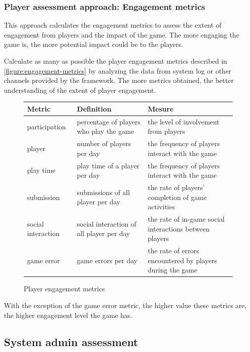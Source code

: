 \documentclass[11pt,oneside]{book}
\newcommand\tabhead[1]{\small\textbf{#1}}
\begin{document}
\subsubsection{Player assessment approach: Engagement metrics}
\label{Engagement metrics}

This approach calculates the engagement metrics to assess the extent of engagement from players and 
the impact of the game. The more engaging the game is, the more potential impact could be to the players.

Calculate as many as possible the player engagement metrics described in \autoref{figure:engagement-metrics} 
by analyzing the data from system log or other channels provided by the framework. The more metrics 
obtained, the better understanding of the extent of player engagement. 

\begin{figure}[ht!]
  \centering
    \begin{tabular}{|p{}|p{}|p{}|}
    \hline
    \tabhead{Metric} &
    \tabhead{Definition} &
    \tabhead{Mesure} \\
    \hline
    participation &
    percentage of players who play the game &
    the level of involvement from players \\
    \hline
    player &
    number of players per day &
    the frequency of players interact with the game \\
    \hline
    play time &
    play time of a player per day &
    the frequency of players interact with the game \\
    \hline
    submission &
    submissions of all player per day &
    the rate of players' completion of game activities \\
    \hline
    social interaction &
    social interaction of all player per day &
    the rate of in-game social interactions between players\\
    \hline
    game error &
    game errors per day &
    the rate of errors encountered by players during the game \\
    \hline
  \end{tabular}
  \caption{Player engagement metrics}
  \label{figure:engagement-metrics}
\end{figure}

With the exception of the game error metric, the higher value these metrics are, the higher engagement 
level the game has.

\subsection{System admin assessment}
\end{document}

